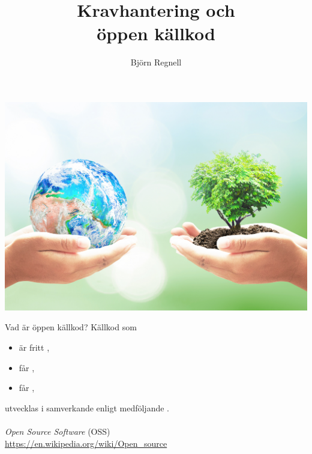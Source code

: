 \documentclass{simpleslides}
\title{Kravhantering och\\ öppen källkod}
\author{Björn Regnell}
\begin{document}
\addtolength{\leftmargini}{-0\labelsep}


\frame{\titlepage}




{  
\begin{Slide}{}
  \vspace*{0.5cm}\hspace*{-0.75cm}\includegraphics[width=1.2\textwidth]{img/earth-tree.jpg}

 {\fontsize{13}{13}\selectfont {}}
\end{Slide}
}

\begin{Slide}{Vad är öppen källkod?}
Källkod som 
  \begin{itemize}
    \item är fritt ,
    \item får ,
    \item får ,
  \end{itemize}
  utvecklas i samverkande  enligt medföljande . \\~\\
{\small \emph{Open Source Software} (OSS) \\ \href{https://en.wikipedia.org/wiki/Open_source}{https://en.wikipedia.org/wiki/Open\_source}}
\end{Slide}
\end{document}
